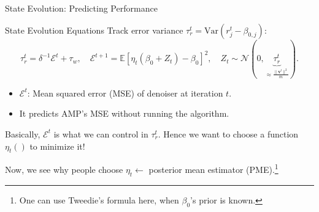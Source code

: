 \documentclass[aspectratio=43, 10pt]{beamer}
\begin{document}
\begin{frame}{State Evolution: Predicting Performance}
    \vspace{-2mm}
    \begin{block}{State Evolution Equations}
        Track error variance \( \tau_r^t = \text{Var}(r_j^t - \beta_{0,j}) \):
        \[
        \tau_r^t = \delta^{-1} \mathcal{E}^t + \tau_w, 
        \quad \mathcal{E}^{t+1} = \mathbb{E} \left[ \eta_t(\beta_{0} + Z_t) - \beta_{0} \right]^2, \quad Z_t \sim \mathcal{N}(0, \underbrace{\tau_r^t}_{\approx \frac{\| \boldsymbol{v}^t \|^2}{m}}).
        \]
    \end{block}
    
    \vspace{3mm}
    \begin{itemize}
        \item \( \mathcal{E}^t \): Mean squared error (MSE) of denoiser at iteration \( t \).
        \item It predicts AMP’s MSE without running the algorithm.
    \end{itemize}

    \vspace{5mm}
    Basically, $\mathcal{E}^t$ is what we can control in $\tau_r^t$. Hence we want to choose a function $\eta_t()$ to minimize it! 

    \vspace{5mm}
    Now, we see why people choose $\eta_t \gets $ posterior mean estimator (PME).\footnote{One can use Tweedie's formula here, when $\beta_0$'s prior is known.}
    
\end{frame}


\end{document}
